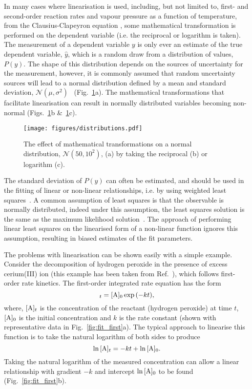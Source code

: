 \documentclass[reprint,superscriptaddress,nobibnotes,amsmath,amssymb]{revtex4-2}
\begin{document}
In many cases where linearisation is used, including, but not limited to, first- and second-order reaction rates and vapour pressure as a function of temperature, from the Clausius-Clapeyron equation \cite{perrin_linear_2017,harper_data_2017}, some mathematical transformation is performed on the dependent variable (i.e. the reciprocal or logarithm is taken). 
The measurement of a dependent variable $y$ is only ever an estimate of the true dependent variable, $\hat{y}$, which is a random draw from a distribution of values, $P(y)$. 
The shape of this distribution depends on the sources of uncertainty for the measurement, however, it is commonly assumed that random uncertainty sources will lead to a normal distribution defined by a mean and standard deviation, $\mathcal{N}(\mu, \sigma^2)$~\cite{monk_math_2010} (Fig.~\ref{fig:distributions}a).
The mathematical transformations that facilitate linearisation can result in normally distributed variables becoming non-normal (Figs.~\ref{fig:distributions}b \&~\ref{fig:distributions}c).
%
\begin{figure}
  \texttt{[image: figures/distributions.pdf]}
  \caption{
    The effect of mathematical transformations on a normal distribution, $\mathcal{N}(50, 10^2)$, (a) by taking the reciprocal (b) or logarithm (c).
    }
  \label{fig:distributions}
\end{figure}
%

The standard deviation of $P(y)$ can often be estimated, and should be used in the fitting of linear or non-linear relationships, i.e. by using weighted least squares~\cite{harris_nonlinear_1998, perrin_linear_2017}.
A common assumption of least squares is that the observable is normally distributed, indeed under this assumption, the least squares solution is the same as the maximum likelihood solution~\cite{hayashi_econometrics_2001}.
The approach of performing linear least squares on the linearised form of a non-linear function ignores this assumption, resulting in biased estimates of the fit parameters. 

The problems with linearisation can be shown easily with a simple example. 
Consider the decomposition of hydrogen peroxide  in the presence of excess cerium(III) ion (this example has been taken from Ref.~\cite{monk_math_2010}), which follows first-order rate kinetics.
The first-order integrated rate equation has the form 
%
\begin{equation}
    [\ce{A}]_t = [\ce{A}]_0\exp{(-kt)},
\end{equation}
%
where, $[\ce{A}]_t$ is the concentration of the reactant  (hydrogen peroxide) at time $t$, $[\ce{A}]_0$ is the initial concentration and $k$ is the rate constant (shown with representative data in Fig.~\ref{fig:fit_first}a).
The typical approach to linearise this function is to take the natural logarithm of both sides to produce
%
\begin{equation}
    \ln{[\ce{A}]_t} = -kt + \ln{[\ce{A}]_0}.
\end{equation}
%
Taking the natural logarithm of the measured concentration can allow a linear relationship with gradient $-k$ and intercept $\ln{[\ce{A}]_0}$ to be found (Fig.~\ref{fig:fit_first}b). 
\end{document}

